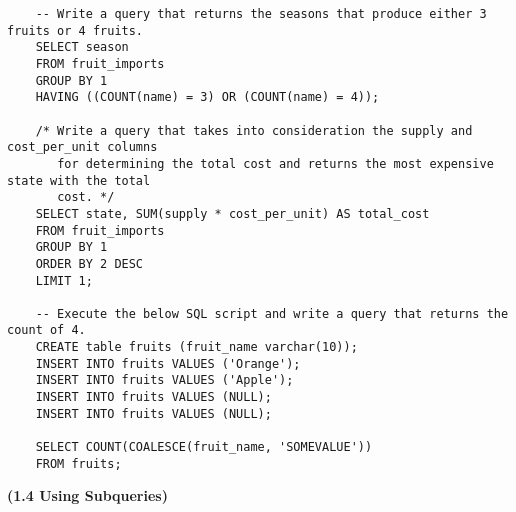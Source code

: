 \documentclass[11pt, a4paper]{article}
\begin{document}
\begin{spacing}{1.1}
\begin{lstlisting}
	-- Write a query that returns the seasons that produce either 3 fruits or 4 fruits.
	SELECT season
	FROM fruit_imports
	GROUP BY 1
	HAVING ((COUNT(name) = 3) OR (COUNT(name) = 4));
	
	/* Write a query that takes into consideration the supply and cost_per_unit columns 
	   for determining the total cost and returns the most expensive state with the total 
	   cost. */
	SELECT state, SUM(supply * cost_per_unit) AS total_cost
	FROM fruit_imports
	GROUP BY 1
	ORDER BY 2 DESC
	LIMIT 1;
	
	-- Execute the below SQL script and write a query that returns the count of 4.	
	CREATE table fruits (fruit_name varchar(10));
	INSERT INTO fruits VALUES ('Orange');
	INSERT INTO fruits VALUES ('Apple');
	INSERT INTO fruits VALUES (NULL);
	INSERT INTO fruits VALUES (NULL);
	
	SELECT COUNT(COALESCE(fruit_name, 'SOMEVALUE'))
	FROM fruits; \end{lstlisting} \vspace*{3mm}
	
	\noindent \large \textbf{(1.4 Using Subqueries)} \normalsize
	
	
\end{spacing}
\end{document}
